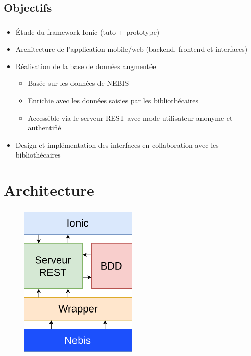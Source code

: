 \documentclass[10pt]{beamer}
\begin{document}
\subsection{Objectifs}
\begin{frame}
	\frametitle{\secname}
	\framesubtitle{\subsecname}
    \begin{itemize}
        \item Étude du framework Ionic (tuto + prototype)
        \item Architecture de l'application mobile/web (backend, frontend et interfaces)
        \item Réalisation de la base de données augmentée
        \begin{itemize}
            \item Basée sur les données de NEBIS
            \item Enrichie avec les données saisies par les bibliothécaires
            \item Accessible via le serveur REST avec mode utilisateur anonyme et authentifié
        \end{itemize}
        \item Design et implémentation des interfaces en collaboration avec les bibliothécaires
    \end{itemize}
\end{frame}

\section{Architecture}
\begin{frame}
	\frametitle{\secname}
	\begin{figure}
		\begin{center}
			\includegraphics[width=0.5\textwidth]{images/architecture_final.png}
		\end{center}
	\end{figure}
\end{frame}
\end{document}
